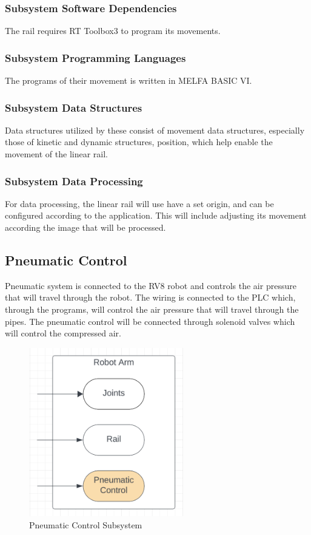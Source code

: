 \subsubsection{Subsystem Software Dependencies}
The rail requires RT Toolbox3 to program its movements.

\subsubsection{Subsystem Programming Languages}
The programs of their movement is written in MELFA BASIC VI.

\subsubsection{Subsystem Data Structures}
Data structures utilized by these consist of movement data structures, especially those of kinetic and dynamic structures, position, which help enable the movement of the linear rail.

\subsubsection{Subsystem Data Processing}
For data processing, the linear rail will use have a set origin, and can be configured according to the application. This will include adjusting its movement according the image that will be processed.




\subsection{Pneumatic Control}
Pneumatic system is connected to the RV8 robot and controls the air pressure that will travel through the robot. The wiring is connected to the PLC which, through the programs, will control the air pressure that will travel through the pipes. The pneumatic control will be connected through solenoid valves which will control the compressed air.

\begin{figure}[h!]
	\centering
 	\includegraphics[width=0.60\textwidth]{images/pneumatic.png}
 \caption{Pneumatic Control Subsystem}
\end{figure}

